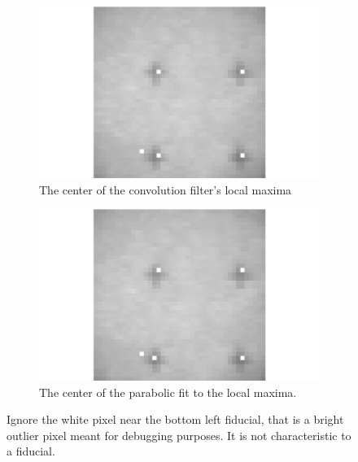 \documentclass[10pt]{scrartcl}
\begin{document}
\begin{figure}[!ht]
    \centering
    \hspace{-1.0in}
    \begin{subfigure}[b]{.45\linewidth}
        \centering
        \includegraphics[width=1.3\textwidth]{../plots_tables_images/notsubpix.png}
        \caption{The center of the convolution filter's local maxima}
    \end{subfigure}
    \hspace{.5in}
    \begin{subfigure}[b]{.45\linewidth}
        \centering
        \includegraphics[width=1.3\textwidth]{../plots_tables_images/subpix.png}
        \caption{The center of the parabolic fit to the local maxima.}
    \end{subfigure}
    \caption{Ignore the white pixel near the bottom left fiducial, that is a bright outlier pixel meant for debugging purposes. It is not characteristic to a fiducial.}
    \label{questionable}
\end{figure}
\end{document}
